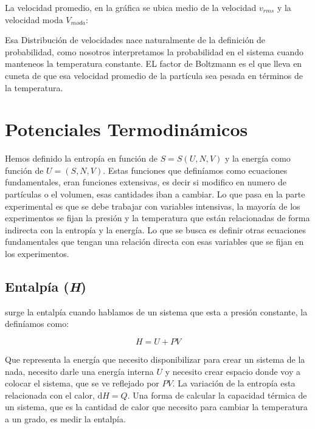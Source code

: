 \documentclass[11pt,fleqn]{book}
\begin{document}
La velocidad promedio, en la gráfica se ubica medio de la velocidad $v_{rms}$ y la velocidad moda $V_{moda}$:


Esa Distribución de velocidades nace naturalmente de la definición de probabilidad, como nosotros interpretamos la probabilidad en el sistema cuando manteneos la temperatura constante. EL factor de  Boltzmann es el que lleva en cuneta de que esa velocidad promedio de la partícula sea pesada en términos de la temperatura. 

\section{Potenciales Termodinámicos}

Hemos definido la entropía en función de $S=S(U, N, V)$ y la energía como función de $U=(S, N, V)$. Estas funciones que definíamos como ecuaciones fundamentales, eran funciones extensivas, es decir si modifico en numero de partículas o el volumen, esas cantidades iban a cambiar. Lo que pasa en la parte experimental es que se debe trabajar con variables intensivas, la mayoría de los experimentos se fijan la presión y  la temperatura que están relacionadas de forma indirecta con la entropía y la energía. Lo que se busca es definir otras ecuaciones fundamentales que tengan una relación directa con esas variables que se fijan en los experimentos.

\subsection{Entalpía (\textit{H})}

surge la entalpía cuando hablamos de un sistema que esta a presión constante, la definíamos como:

\begin{equation}
        H=U+PV
    \label{Eq. 4.53}
\end{equation}

Que representa la energía que necesito disponibilizar para crear un sistema de la nada, necesito darle una energía interna $U$ y necesito crear espacio donde voy a colocar el sistema, que se ve reflejado por $PV$. La variación de la entropía esta relacionada con el calor, $\mathrm{d}H=Q$. Una forma de calcular la capacidad térmica de un sistema, que es la cantidad de calor que necesito para cambiar la temperatura a un grado, es medir la entalpía. \\
\end{document}
